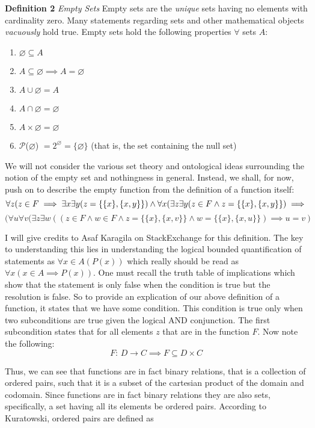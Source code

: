 \documentclass{article}
\begin{document}
\\
\\
\textbf{Definition 2} \textit{Empty Sets} Empty sets are the \textit{unique} sets having no elements with cardinality zero. Many statements regarding sets and other mathematical objects \textit{vacuously} hold true. Empty sets hold the following properties $\forall$ sets $A$:
\begin{enumerate}
\item $\varnothing \subseteq A$
\item $A \subseteq \varnothing \implies A=\varnothing$
\item $A \cup \varnothing = A$
\item $A \cap \varnothing = \varnothing$
\item $A \times \varnothing = \varnothing$
\item $\mathcal{P}$($\varnothing$) $= 2^\varnothing = \{\varnothing\}$ (that is, the set containing the null set)
\end{enumerate}
\par We will not consider the various set theory and ontological ideas surrounding the notion of the empty set and nothingness in general. Instead, we shall, for now, push on to describe the empty function from the definition of a function itself:
\[
\forall z (z\in F\implies\exists x\exists y(z=\{\{x\},\{x,y\}\})\land\\  \forall x(\exists z\exists y(z\in F\land z=\{\{x\},\{x,y\}\})\implies \\ 
\]
\[
(\forall u\forall v(\exists z\exists w((z\in F\land w\in F\land z= \{\{x\},\{x,v\}\}\land w=\{\{x\},\{x,u\}\})\implies u=v)
\]
\par I will give credits to Asaf Karagila on StackExchange for this definition. The key to understanding this lies in understanding the logical bounded quantification of statements as $\forall x\in A(P(x))$ which really should be read as $\forall x(x\in A\implies P(x))$. One must recall the truth table of implications which show that the statement is only false when the condition is true but the resolution is false. So to provide an explication of our above definition of a function, it states that we have some condition. This condition is true only when two subconditions are true given the logical AND conjunction. The first subcondition states that for all elements $z$ that are in the function $F$. Now note the following: 
\[
{F\text{: } D \to C} \implies F \subseteq D \times C
\]
\par Thus, we can see that functions are in fact binary relations, that is a collection of ordered pairs, such that it is a subset of the cartesian product of the domain and codomain. Since functions are in fact binary relations they are also sets, specifically, a set having all its elements be ordered pairs. According to Kuratowski, ordered pairs are defined as
\end{document}
